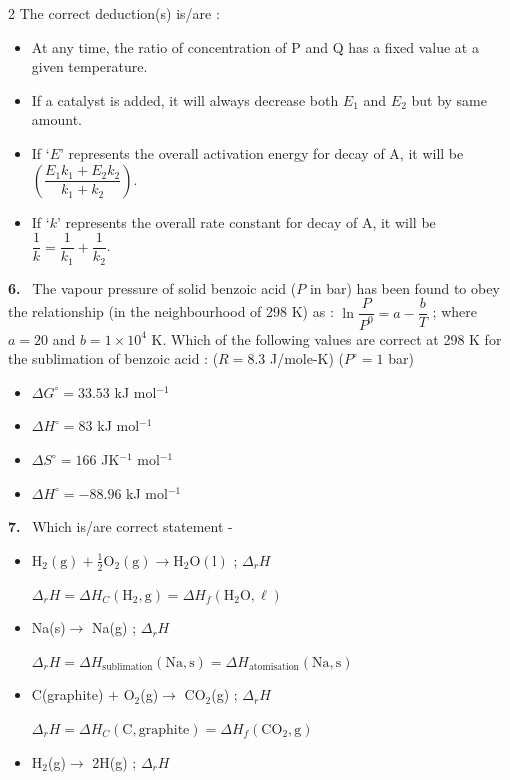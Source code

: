 \documentclass[10pt]{extarticle}
\newcommand{\qn}[1]{\par\smallskip\noindent\textbf{#1.}~}
\newenvironment{qoptions}{\begin{itemize}[leftmargin=1.8em,itemsep=1pt,topsep=2pt,label={}]}{\end{itemize}}
\newcommand{\opt}[2]{\item[(#1)] #2}
\begin{document}
\begin{multicols}{2}
The correct deduction(s) is/are :
\begin{qoptions}
\opt{A}{At any time, the ratio of concentration of P and Q has a fixed value at a given temperature.}
\opt{B}{If a catalyst is added, it will always decrease both $E_1$ and $E_2$ but by same amount.}
\opt{C}{If `$E$' represents the overall activation energy for decay of A, it will be $\left(\dfrac{E_1k_1+E_2k_2}{k_1+k_2}\right)$.}
\opt{D}{If `$k$' represents the overall rate constant for decay of A, it will be $\dfrac1k=\dfrac1{k_1}+\dfrac1{k_2}$.}
\end{qoptions}
\qn{6} The vapour pressure of solid benzoic acid ($P$ in bar) has been found to obey the relationship (in the neighbourhood of 298 K) as : $\ln\dfrac P{P^0}=a-\dfrac bT$ ; where $a=20$ and $b=1\times10^4$ K. Which of the following values are correct at 298 K for the sublimation of benzoic acid : ($R=8.3$ J/mole-K) ($P^\circ=1$ bar)
\begin{qoptions}
\opt{A}{$\Delta G^\circ=33.53$ kJ mol$^{-1}$}
\opt{B}{$\Delta H^\circ=83$ kJ mol$^{-1}$}
\opt{C}{$\Delta S^\circ=166$ JK$^{-1}$ mol$^{-1}$}
\opt{D}{$\Delta H^\circ=-88.96$ kJ mol$^{-1}$}
\end{qoptions}
\qn{7} Which is/are correct statement -
\begin{qoptions}
\opt{A}{$\mathrm{H_2(g)+\tfrac12O_2(g)\to H_2O(l)}$ ; $\Delta_r H$

$\Delta_rH=\Delta H_C(\mathrm{H_2,g})=\Delta H_f(\mathrm{H_2O},\ell)$}
\opt{B}{Na(s)$\to$ Na(g) ; $\Delta_rH$

$\Delta_rH=\Delta H_{\text{sublimation}}(\mathrm{Na,s})=\Delta H_{\text{atomisation}}(\mathrm{Na,s})$}
\opt{C}{C(graphite) $+$ O$_2$(g)$\to$ CO$_2$(g) ; $\Delta_rH$

$\Delta_rH=\Delta H_C(\mathrm{C,graphite})=\Delta H_f(\mathrm{CO_2,g})$}
\opt{D}{H$_2$(g)$\to$ 2H(g) ; $\Delta_rH$

}
\end{qoptions}
\end{multicols}
\end{document}
